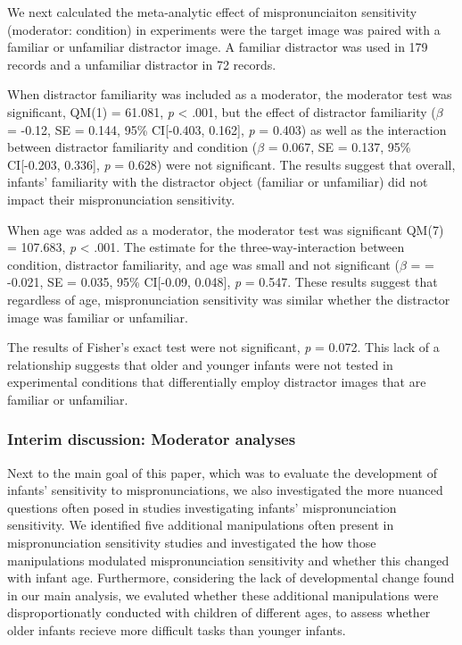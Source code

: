 \documentclass[man]{apa6}
\begin{document}
We next calculated the meta-analytic effect of mispronunciaiton sensitivity (moderator: condition) in experiments were the target image was paired with a familiar or unfamiliar distractor image. A familiar distractor was used in 179 records and a unfamiliar distractor in 72 records.

When distractor familiarity was included as a moderator, the moderator test was significant, QM(1) = 61.081, \emph{p} \textless{} .001, but the effect of distractor familiarity (\(\beta\) = -0.12, SE = 0.144, 95\% CI{[}-0.403, 0.162{]}, \emph{p} = 0.403) as well as the interaction between distractor familiarity and condition (\(\beta\) = 0.067, SE = 0.137, 95\% CI{[}-0.203, 0.336{]}, \emph{p} = 0.628) were not significant. The results suggest that overall, infants' familiarity with the distractor object (familiar or unfamiliar) did not impact their mispronunciation sensitivity.

When age was added as a moderator, the moderator test was significant QM(7) = 107.683, \emph{p} \textless{} .001. The estimate for the three-way-interaction between condition, distractor familiarity, and age was small and not significant (\(\beta\) = = -0.021, SE = 0.035, 95\% CI{[}-0.09, 0.048{]}, \emph{p} = 0.547. These results suggest that regardless of age, mispronunciation sensitivity was similar whether the distractor image was familiar or unfamiliar.

The results of Fisher's exact test were not significant, \emph{p} = 0.072. This lack of a relationship suggests that older and younger infants were not tested in experimental conditions that differentially employ distractor images that are familiar or unfamiliar.

\hypertarget{interim-discussion-moderator-analyses}{%
\subsubsection{Interim discussion: Moderator analyses}\label{interim-discussion-moderator-analyses}}

Next to the main goal of this paper, which was to evaluate the development of infants' sensitivity to mispronunciations, we also investigated the more nuanced questions often posed in studies investigating infants' mispronunciation sensitivity. We identified five additional manipulations often present in mispronunciation sensitivity studies and investigated the how those manipulations modulated mispronunciation sensitivity and whether this changed with infant age. Furthermore, considering the lack of developmental change found in our main analysis, we evaluted whether these additional manipulations were disproportionatly conducted with children of different ages, to assess whether older infants recieve more difficult tasks than younger infants.
\end{document}

